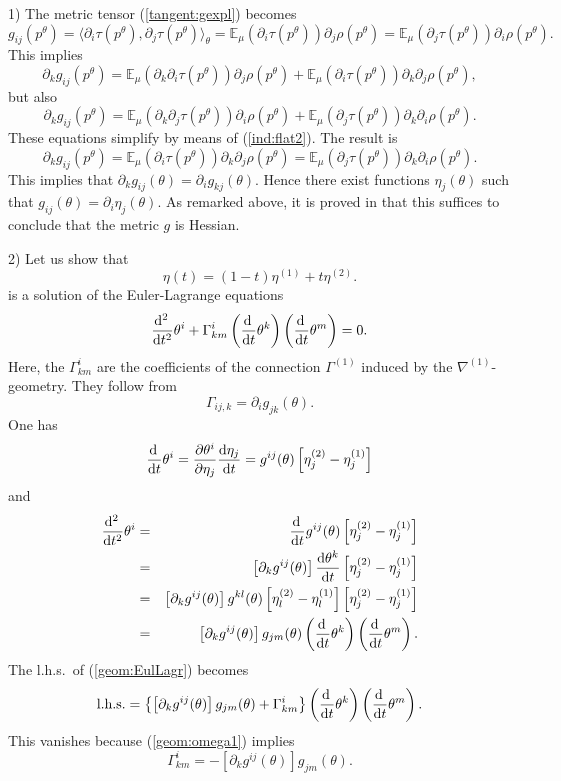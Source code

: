 \documentclass[graybox]{svmult}
\newcommand{\be}{\begin{equation}}
\newcommand{\ee}{\end{equation}}
\newcommand{\beq}{\begin{eqnarray}}
\newcommand{\eeq}{\end{eqnarray}}
\newcommand{\Eo}{\mathbb E}
\newcommand{\beginproof}{\par\strut\vskip 0.0cm\noindent{\bf Proof}\par}
\newcommand{\upd}{{\rm d}}
\begin{document}
\beginproof

1)
The metric tensor (\ref {tangent:gexpl}) becomes
$$
g_{ij}(p^\theta)=\langle\partial_i\tau(p^\theta),\partial_j\tau(p^\theta)\rangle_\theta
=\Eo_\mu \left(\partial_i\tau(p^\theta)\right)\partial_j\rho(p^\theta)
=\Eo_\mu \left(\partial_j\tau(p^\theta)\right)\partial_i\rho(p^\theta).$$
This implies
$$
\partial_kg_{ij}(p^\theta)=\Eo_\mu \left(\partial_k\partial_i\tau(p^\theta)\right)\partial_j\rho(p^\theta)
+\Eo_\mu \left(\partial_i\tau(p^\theta)\right)\partial_k\partial_j\rho(p^\theta),$$
but also
$$
\partial_kg_{ij}(p^\theta)=
\Eo_\mu \left(\partial_k\partial_j\tau(p^\theta)\right)\partial_i\rho(p^\theta)
+\Eo_\mu \left(\partial_j\tau(p^\theta)\right)\partial_k\partial_i\rho(p^\theta).$$
These equations simplify by means of (\ref {ind:flat2}). The result is
$$
\partial_kg_{ij}(p^\theta)=
\Eo_\mu \left(\partial_i\tau(p^\theta)\right)\partial_k\partial_j\rho(p^\theta)
=\Eo_\mu \left(\partial_j\tau(p^\theta)\right)\partial_k\partial_i\rho(p^\theta).$$
This implies that $\partial_k g_{ij}(\theta)=\partial_i g_{kj}(\theta)$.
Hence there exist functions $\eta_j(\theta)$ such that
$g_{ij}(\theta)=\partial_i\eta_j(\theta)$. As remarked above, it is proved in
\cite{NZ17} that this suffices to conclude that the metric $g$ is Hessian.

2)
Let us show that
\be
\eta(t)=(1-t)\eta^{(1)}+t\eta^{(2)}.
\label{geom:etaflat}
\ee
is a solution of the Euler-Lagrange equations
\be
\frac{\upd^2\,}{\upd t^2}\theta^i
+\Gamma^i_{km}
\left(\frac{\upd\,}{\upd t}\theta^k\right)
\left(\frac{\upd\,}{\upd t}\theta^m\right)
=0.
\label{geom:EulLagr}
\ee
Here, the $\Gamma^i_{km}$ are the coefficients of the connection $\Gamma^{(1)}$
induced by the $\nabla^{(1)}$-geometry.
They follow from
\be
\Gamma_{ij,k}=\partial_ig_{jk}(\theta).
\label {geom:omega1}
\ee
One has
\be
\frac{\upd\,}{\upd t}\theta^i
=\frac{\partial\theta^i}{\partial\eta_j}\frac{\upd\eta_j}{\upd t}
=g^{ij}(\theta)\left[\eta^{(2)}_j-\eta^{(1)}_j\right]
\nonumber
\ee
and
\beq
\frac{\upd^2\,}{\upd t^2}\theta^i
&=&
\frac{\upd\,}{\upd t}g^{ij}(\theta)\left[\eta^{(2)}_j-\eta^{(1)}_j\right]\cr
&=&
\left[\partial_kg^{ij}(\theta)\right]\frac{\upd\theta^k}{\upd t}\left[\eta^{(2)}_j-\eta^{(1)}_j\right]\cr
&=&
\left[\partial_kg^{ij}(\theta)\right]g^{kl}(\theta)
\left[\eta^{(2)}_l-\eta^{(1)}_l\right]
\left[\eta^{(2)}_j-\eta^{(1)}_j\right]\cr
&=&
\left[\partial_kg^{ij}(\theta)\right]g_{jm}(\theta)
\left(\frac{\upd\,}{\upd t}\theta^k\right)
\left(\frac{\upd\,}{\upd t}\theta^m\right).
\nonumber
\eeq
The l.h.s.~of (\ref {geom:EulLagr}) becomes
\be
\mbox{l.h.s.}
=
\left\{
\left[\partial_kg^{ij}(\theta)\right]g_{jm}(\theta)
+\Gamma^i_{km}
\right\}
\left(\frac{\upd\,}{\upd t}\theta^k\right)
\left(\frac{\upd\,}{\upd t}\theta^m\right).
\nonumber
\ee
This vanishes because (\ref {geom:omega1}) implies
\be
\Gamma^i_{km}=-\left[\partial_kg^{ij}(\theta)\right]g_{jm}(\theta).
\nonumber
\ee
\end{document}
